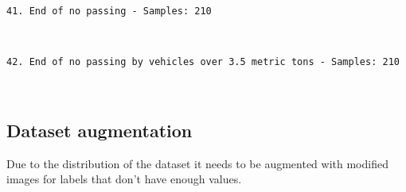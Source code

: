\documentclass[11pt]{article}
\begin{document}
    \begin{Verbatim}[commandchars=\\\{\}]
41. End of no passing - Samples: 210

    \end{Verbatim}

    \begin{center}
    \end{center}
    { \hspace*{\fill} \\}
    
    \begin{Verbatim}[commandchars=\\\{\}]
42. End of no passing by vehicles over 3.5 metric tons - Samples: 210

    \end{Verbatim}

    \begin{center}
    \end{center}
    { \hspace*{\fill} \\}
    
    \subsection{Dataset augmentation}\label{dataset-augmentation}

Due to the distribution of the dataset it needs to be augmented with
modified images for labels that don't have enough values.
\end{document}
